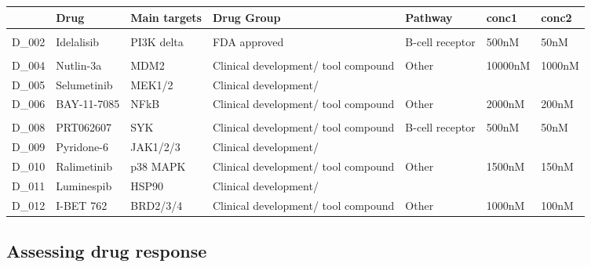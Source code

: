 \documentclass[11pt, a4paper, twosided]{book}
\begin{document}
\begin{table}
\centering
\begin{tabular}{l|l|l|l|l|l|l}
\hline
\textbf{ } & \textbf{Drug} & \textbf{Main targets} & \textbf{Drug Group} & \textbf{Pathway} & \textbf{conc1} & \textbf{conc2}\\
\hline
\cellcolor[HTML]{E2E868}{D\_001} & \cellcolor[HTML]{E2E868}{Ibrutinib} & \cellcolor[HTML]{E2E868}{BTK} & \cellcolor[HTML]{E2E868}{FDA approved} & \cellcolor[HTML]{E2E868}{B-cell receptor} & \cellcolor[HTML]{E2E868}{500nM} & \cellcolor[HTML]{E2E868}{50nM}\\
\hline
D\_002 & Idelalisib & PI3K delta & FDA approved & B-cell receptor & 500nM & 50nM\\
\hline
\cellcolor[HTML]{E2E868}{D\_003} & \cellcolor[HTML]{E2E868}{Fludarabine} & \cellcolor[HTML]{E2E868}{Purine analogue} & \cellcolor[HTML]{E2E868}{FDA approved} & \cellcolor[HTML]{E2E868}{Other} & \cellcolor[HTML]{E2E868}{2000nM} & \cellcolor[HTML]{E2E868}{200nM}\\
\hline
D\_004 & Nutlin-3a & MDM2 & Clinical development/
tool compound & Other & 10000nM & 1000nM\\
\hline
D\_005 & Selumetinib & MEK1/2 & Clinical development/
\cellcolor[HTML]{E2E868}{tool compound} & \cellcolor[HTML]{E2E868}{Other} & \cellcolor[HTML]{E2E868}{1000nM} & \cellcolor[HTML]{E2E868}{\vphantom{1} 100nM}\\
\hline
D\_006 & BAY-11-7085 & NFkB & Clinical development/
tool compound & Other & 2000nM & 200nM\\
\hline
\cellcolor[HTML]{E2E868}{D\_007} & \cellcolor[HTML]{E2E868}{Everolimus} & \cellcolor[HTML]{E2E868}{mTOR} & \cellcolor[HTML]{E2E868}{FDA approved} & \cellcolor[HTML]{E2E868}{Other} & \cellcolor[HTML]{E2E868}{500nM} & \cellcolor[HTML]{E2E868}{50nM}\\
\hline
D\_008 & PRT062607 & SYK & Clinical development/
tool compound & B-cell receptor & 500nM & 50nM\\
\hline
D\_009 & Pyridone-6 & JAK1/2/3 & Clinical development/
\cellcolor[HTML]{E2E868}{tool compound} & \cellcolor[HTML]{E2E868}{Other} & \cellcolor[HTML]{E2E868}{500nM} & \cellcolor[HTML]{E2E868}{50nM}\\
\hline
D\_010 & Ralimetinib & p38 MAPK & Clinical development/
tool compound & Other & 1500nM & 150nM\\
\hline
D\_011 & Luminespib & HSP90 & Clinical development/
\cellcolor[HTML]{E2E868}{tool compound} & \cellcolor[HTML]{E2E868}{Other} & \cellcolor[HTML]{E2E868}{200nM} & \cellcolor[HTML]{E2E868}{20nM}\\
\hline
D\_012 & I-BET 762 & BRD2/3/4 & Clinical development/
tool compound & Other & 1000nM & 100nM\\
\hline
\end{tabular}
\end{table}
\hypertarget{assessing-drug-response}{%
\subsection{Assessing drug response}\label{assessing-drug-response}}
\end{document}
